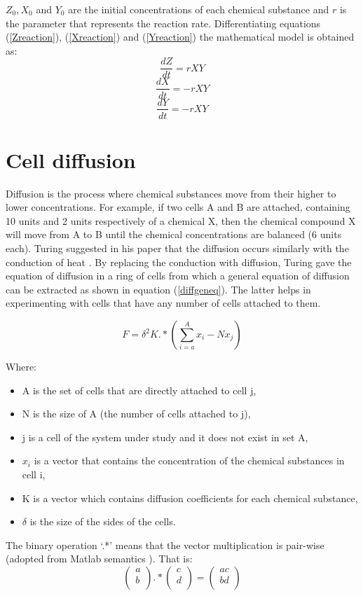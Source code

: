 $ Z_0, X_0 $ and $ Y_0 $ are the initial concentrations of each chemical substance and $r$ is the parameter that represents the reaction rate. Differentiating equations (\ref{Zreaction}), (\ref{Xreaction}) and (\ref{Yreaction}) the mathematical model is obtained as:
$$ \frac{dZ}{dt} = rXY $$
$$ \frac{dX}{dt} = -rXY $$
$$\frac{dY}{dt} = -rXY$$

\section{Cell diffusion}
\label{diffusion}
Diffusion is the process where chemical substances move from their higher to lower concentrations. For example, if two cells A and B are attached, containing 10 units and 2 units respectively of a chemical X, then the chemical compound X will move from A to B until the chemical concentrations are balanced (6 units each). Turing suggested in his paper that the diffusion occurs similarly with the conduction of heat \cite[p.~40]{turing_chemical_1990}. By replacing the conduction with diffusion, Turing gave the equation of diffusion in a ring of cells \cite[p.~47]{turing_chemical_1990} from which a general equation of diffusion can be extracted as shown in equation (\ref{diffgeneq}). The latter helps in experimenting with cells that have any number of cells attached to them.

\begin{equation}
\label{diffgeneq}
F = \delta^2K.*(\sum_{i=a}^{A} x_i - Nx_j)
\end{equation}

Where:
\begin{itemize}
\item A is the set of cells that are directly attached to cell j,
\item N is the size of A (the number of cells attached to j),
\item j is a cell of the system under study and it does not exist in set A,
\item $ x_i $ is a vector that contains the concentration of the chemical substances in cell i,
\item K is a vector which contains diffusion coefficients for each chemical substance, 
\item $\delta$ is the size of the sides of the cells.
\end{itemize}
The binary operation `.*' means that the vector multiplication is pair-wise (adopted from Matlab semantics \cite{MATLAB_2010}). That is:
$$ 
 \begin{pmatrix}
  a\\
  b\\
 \end{pmatrix}.*
 \begin{pmatrix}
  c\\
  d\\
 \end{pmatrix} =
 \begin{pmatrix}
  ac\\
  bd\\
 \end{pmatrix}
$$

